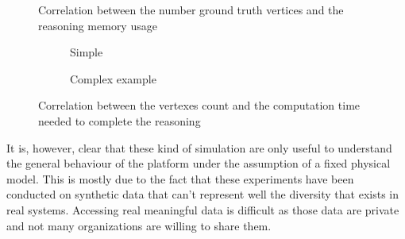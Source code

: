 \begin{figure}
  \centering
  \caption{Correlation between the number ground truth vertices and the reasoning memory usage}
  \label{fig:vertexes_mem_chart}
\end{figure}
\begin{figure}
  \centering
  \begin{subfigure}[b]{.475\textwidth}
      \caption{Simple}
      \label{fig:time_req_simple}
  \end{subfigure}
  \begin{subfigure}[b]{.475\textwidth}
    \caption{Complex example}
    \label{fig:time_req_complex}
  \end{subfigure}
  \centering
  \caption{Correlation between the vertexes count and the computation time needed to complete the reasoning}
  \label{fig:time_chart}
\end{figure}
It is, however, clear that these kind of simulation are only useful to understand the general behaviour of the platform under the assumption of a fixed physical model. This is mostly due to the fact that these experiments have been conducted on synthetic data that can't represent well the diversity that exists in real systems. Accessing real meaningful data is difficult as those data are private and not many organizations are willing to share them.
